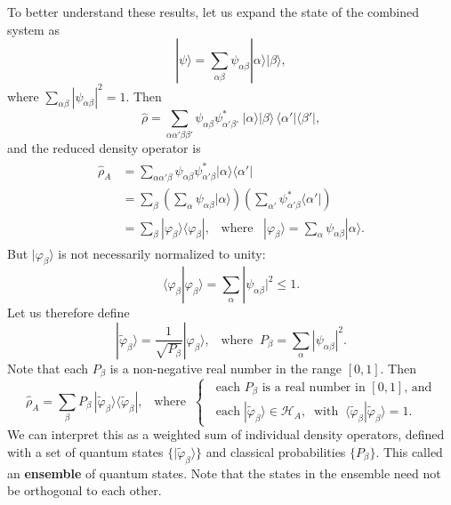 \documentclass[pra,12pt]{revtex4-2}
\begin{document}
To better understand these results, let us expand the state of the
combined system as
\begin{equation}
  |\psi\rangle = \sum_{\alpha\beta} \psi_{\alpha\beta} |\alpha\rangle |\beta\rangle,
\end{equation}
where $\sum_{\alpha\beta} |\psi_{\alpha\beta}|^2 = 1$.  Then
\begin{equation}
  \hat{\rho} = \sum_{\alpha\alpha'\beta\beta'} \psi_{\alpha\beta}
  \psi_{\alpha'\beta'}^* \; |\alpha\rangle |\beta\rangle \,
  \langle\alpha'|\langle \beta'|,
\end{equation}
and the reduced density operator is
\begin{align}
  \begin{aligned}
    \hat{\rho}_A &= \sum_{\alpha\alpha'\beta} \psi_{\alpha\beta}\psi_{\alpha'\beta}^* |\alpha\rangle
    \langle\alpha'| \\
    &= \sum_\beta \left(\sum_\alpha \psi_{\alpha\beta} |\alpha\rangle\right)
    \left(\sum_{\alpha'} \psi_{\alpha'\beta}^*\langle\alpha'|\right) \\
    &= \sum_\beta |\varphi_\beta\rangle \langle \varphi_\beta|,
    \;\;\;\mathrm{where}\;\;\;
    |\varphi_\beta\rangle = \sum_\alpha \psi_{\alpha\beta} |\alpha\rangle.
  \end{aligned}
\end{align}
But $|\varphi_\beta\rangle$ is not necessarily normalized to unity:
\begin{equation}
  \langle \varphi_\beta | \varphi_\beta\rangle =
  \sum_{\alpha}|\psi_{\alpha\beta}|^2 \le 1.
\end{equation}
Let us therefore define
\begin{equation}
  |\tilde{\varphi}_\beta\rangle = \frac{1}{\sqrt{P_\beta}} |\varphi_\beta\rangle,
  \;\;\;\mathrm{where} \;\; P_\beta = \sum_{\alpha}|\psi_{\alpha\beta}|^2.
\end{equation}
Note that each $P_\beta$ is a non-negative real number in the range
$[0,1]$.  Then
\begin{equation}
  \hat{\rho}_A = \sum_\beta P_\beta\, |\tilde{\varphi}_\beta\rangle
  \langle \tilde{\varphi}_\beta|,
  \;\;\;\mathrm{where}\;\;
  \begin{cases}
    \;\;\textrm{each $P_\beta$ is a real number in $[0,1]$, and} \\
    \;\;\textrm{each}\; |\tilde{\varphi}_\beta\rangle \in \mathscr{H}_A,
    \;\;\mathrm{with}
    \;\;\langle\tilde{\varphi}_\beta|\tilde{\varphi}_\beta\rangle = 1.
  \end{cases}
  \label{rhoform}
\end{equation}
We can interpret this as a weighted sum of individual density
operators, defined with a set of quantum states
$\{|\tilde{\varphi}_\beta\rangle\}$ and classical probabilities
$\{P_\beta\}$.  This called an \textbf{ensemble} of quantum states.
Note that the states in the ensemble need not be orthogonal to each
other.
\end{document}
